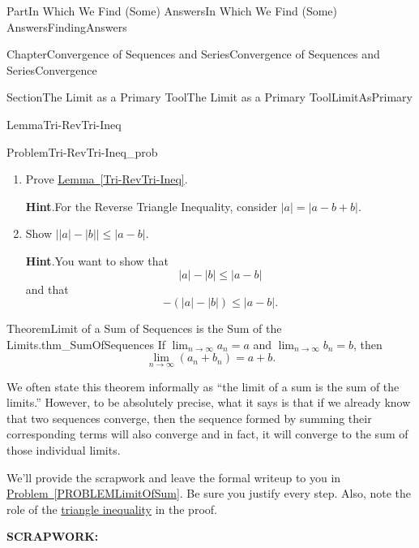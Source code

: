 \documentclass[oneside,10pt,]{book}
\newcommand{\blocktitlefont}{\relax}
\newcommand{\xreffont}{\relax}
\newcommand{\terminology}[1]{\textbf{#1}}
\numberwithin{equation}{part}
\newcommand{\abs}[1]{\left|#1\right|}
\def\limit#1#2#3{{\displaystyle\lim_{#1\rightarrow #2}#3}}
\def\limitt#1#2#3{{\displaystyle\lim_{#1\rightarrow #2}\textstyle #3}}
\begin{document}
\begin{partptx}{Part}{In Which We Find (Some) Answers}{}{In Which We Find (Some) Answers}{}{}{FindingAnswers}
\begin{chapterptx}{Chapter}{Convergence of Sequences and Series}{}{Convergence of Sequences and Series}{}{}{Convergence}
\begin{sectionptx}{Section}{The Limit as a Primary Tool}{}{The Limit as a Primary Tool}{}{}{LimitAsPrimary}
\begin{lemma}{Lemma}{}{}{Tri-RevTri-Ineq}
\begin{descriptionlist}
\end{descriptionlist}
%
\end{lemma}
\begin{problem}{Problem}{}{Tri-RevTri-Ineq_prob}%
\begin{enumerate}[font=\bfseries,label=(\alph*),ref=\alph*]%
\item{}Prove \hyperref[Tri-RevTri-Ineq]{Lemma~{\xreffont\ref{Tri-RevTri-Ineq}}}.%
\par\smallskip%
\noindent\textbf{\blocktitlefont Hint}.\hypertarget{Tri-RevTri-Ineq_prob-2-2}{}\quad{}For the Reverse Triangle Inequality, consider \(\abs{a}=\abs{a-b+b}\).%
\item{}Show \(\Big||a|-|b|\Big|\leq|a-b|\).%
\par\smallskip%
\noindent\textbf{\blocktitlefont Hint}.\hypertarget{Tri-RevTri-Ineq_prob-3-2}{}\quad{}You want to show that%
\begin{equation*}
|a|-|b|\leq|a-b|
\end{equation*}
and that%
\begin{equation*}
-\left(|a|-|b|\right)\leq|a-b|\text{.}
\end{equation*}
%
\end{enumerate}%
\end{problem}
\begin{theorem}{Theorem}{Limit of a Sum of Sequences is the Sum of the Limits.}{}{thm_SumOfSequences}%
%
If \(\limitt{n}{\infty}{a_n}=a\) and \(\limitt{n}{\infty}{b_n}=b\), then%
\begin{equation*}
\limit{n}{\infty}{\left(a_n+b_n\right)}=a+b\text{.}
\end{equation*}
%
\end{theorem}
We  often state this theorem informally as ``the limit of a sum is the sum of the limits.'' However, to be absolutely precise, what it says is that if we already know that two sequences converge, then the sequence formed by summing their corresponding terms  will also converge and in fact, it will converge to the sum of those individual limits.%
\par
We'll provide the scrapwork and leave the formal write\textendash{}up to you in \hyperref[PROBLEMLimitOfSum]{Problem~{\xreffont\ref{PROBLEMLimitOfSum}}}. Be sure you justify every step. Also, note the role of the \hyperref[Tri-RevTri-Ineq]{triangle inequality} in the proof.%
\par
\terminology{SCRAPWORK:}%
\par

\end{sectionptx}
\end{chapterptx}
\end{partptx}
\end{document}
